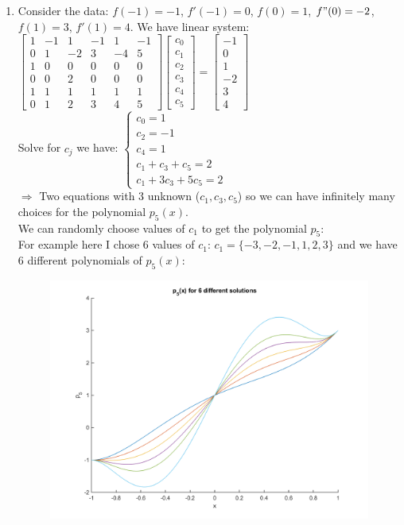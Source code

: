\documentclass[14pt,a4paper]{article}
\begin{document}
\begin{enumerate}
		\item Consider the data: $f(-1) = -1$, $f'(-1) = 0$, $ f(0) = 1$, $f"(0) = -2$, $f(1) = 3$, $f'(1) = 4$. We have linear system: \\
		\hspace*{2cm} $\begin{bmatrix} 1&-1&1&-1&1&-1 \\ 0&1&-2&3&-4&5 \\ 1&0&0&0&0&0 \\ 0&0&2&0&0&0 \\ 1&1&1&1&1&1 \\ 0&1&2&3&4&5	\end{bmatrix} \begin{bmatrix} c_0\\c_1\\c_2\\c_3\\c_4\\c_5 \end{bmatrix} = \begin{bmatrix} -1\\ 0 \\ 1 \\ -2 \\ 3 \\ 4 \end{bmatrix} $ \\
		Solve for $c_j$ we have: \hspace{0.2cm} $\begin{cases} c_0 = 1 \\ c_2 = -1 \\ c_4 = 1 \\ c_1 + c_3 + c_5 = 2 \\
		c_1 + 3c_3 + 5c_5 = 2 \end{cases}$ \\
		$\Rightarrow$ Two equations with 3 unknown ($c_1,c_3,c_5$) so we can have infinitely many choices for the polynomial $p_5(x)$. \\
		We can randomly choose values of $c_1$ to get the polynomial $p_5$:\\
		For example here I chose 6 values of $c_1$: $c_1 =\{ -3,-2,-1,1,2,3\}$ and we have 6 different polynomials of $p_5(x)$: 
		\begin{figure}[htp]
			\centering
			\includegraphics[scale=0.8]{p5_6solutions.png}

\end{figure}
\end{enumerate}
\end{document}
